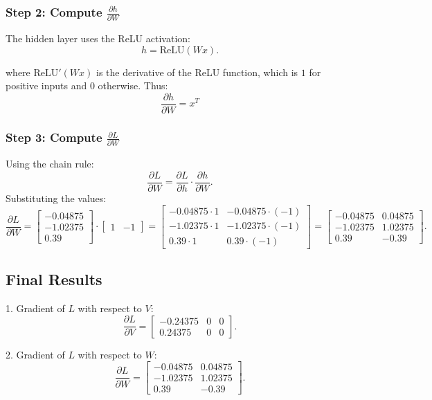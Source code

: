 \documentclass[12pt]{ass1.cls}
\begin{document}
\subsubsection*{Step 2: Compute \( \frac{\partial h}{\partial W} \)}

The hidden layer uses the ReLU activation:
\[
h = \text{ReLU}(Wx).
\]

where \( \text{ReLU}'(Wx) \) is the derivative of the ReLU function, which is \( 1 \) for positive inputs and \( 0 \) otherwise. 
Thus:
\[
\frac{\partial h}{\partial W}
=
x^T

\]

\subsubsection*{Step 3: Compute \( \frac{\partial L}{\partial W} \)}

Using the chain rule:
\[
\frac{\partial L}{\partial W} = \frac{\partial L}{\partial h} \cdot \frac{\partial h}{\partial W}.
\]
Substituting the values:
\[
\frac{\partial L}{\partial W} =
\begin{bmatrix}
-0.04875 \\
-1.02375 \\
0.39
\end{bmatrix}
\cdot
\begin{bmatrix}
1 & -1
\end{bmatrix}
=
\begin{bmatrix}
-0.04875 \cdot 1 & -0.04875 \cdot (-1) \\
-1.02375 \cdot 1 & -1.02375 \cdot (-1) \\
0.39 \cdot 1 & 0.39 \cdot (-1)
\end{bmatrix}
=
\begin{bmatrix}
-0.04875 & 0.04875 \\
-1.02375 & 1.02375 \\
0.39 & -0.39
\end{bmatrix}.
\]

\subsection*{Final Results}

1. Gradient of \( L \) with respect to \( V \):
\[
\frac{\partial L}{\partial V} =
\begin{bmatrix}
-0.24375 & 0 & 0 \\
0.24375 & 0 & 0
\end{bmatrix}.
\]

2. Gradient of \( L \) with respect to \( W \):
\[
\frac{\partial L}{\partial W} =
\begin{bmatrix}
-0.04875 & 0.04875 \\
-1.02375 & 1.02375 \\
0.39 & -0.39
\end{bmatrix}.
\]







 
\end{document}
